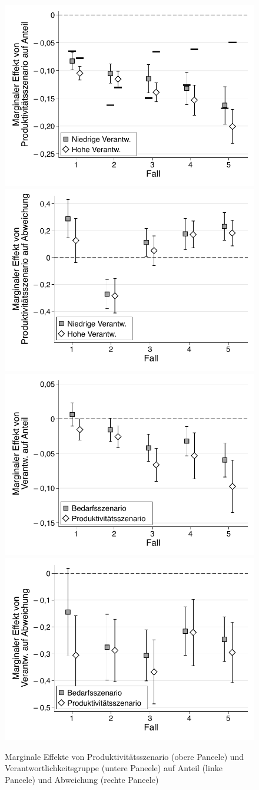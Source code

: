 \documentclass[justified,nobib,nohyper,symmetric,twoside]{tufte-book}
\begin{document}
\begin{figure}[t]\label{fig:abbildung_8}
   \centering
   \caption{Marginale Effekte von Produktivitätsszenario (obere Paneele) und Verantwortlichkeitsgruppe (untere Paneele) auf Anteil (linke Paneele) und Abweichung (rechte Paneele)}
   \includegraphics[width=0.49\linewidth]{figure_8_a.pdf}
   \includegraphics[width=0.49\linewidth]{figure_8_b.pdf}
   \includegraphics[width=0.49\linewidth]{figure_8_c.pdf}
   \includegraphics[width=0.49\linewidth]{figure_8_d.pdf}
\end{figure}
\end{document}
